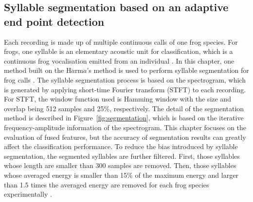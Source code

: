 \subsection{Syllable segmentation based on an adaptive end point detection}
\label{Ch3:segmentationProcess}

Each recording is made up of multiple continuous calls of one frog species. For frogs, one syllable is an elementary acoustic unit for classification, which is a continuous frog vocalisation emitted from an individual \citep{huang2009frog}. In this chapter, one method built on the H$\ddot{a}$rm$\ddot{a}$'s method is used to perform syllable segmentation for frog calls \citep{harma2003automatic}. The syllable segmentation process is based on the spectrogram, which is generated by applying short-time Fourier transform (STFT) to each recording. For STFT, the window function used is Hamming window with the size and overlap being 512 samples and 25\%, respectively. The detail of the segmentation method is described in Figure~\ref{fig:segmentation}, which is based on the iterative frequency-amplitude information of the spectrogram. This chapter focuses on the evaluation of fused features, but the accuracy of segmentation results can greatly affect the classification performance. To reduce the bias introduced by syllable segmentation, the segmented syllables are further filtered. First, those syllables whose length are smaller than 300 samples are removed. Then, those syllables whose averaged energy is smaller than 15\% of the maximum energy and larger than 1.5 times the averaged energy are removed for each frog species experimentally \citep{Gingras2013}.


